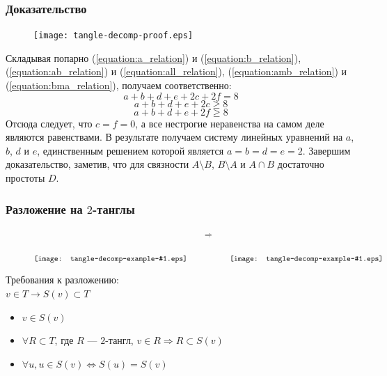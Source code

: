 \documentclass[dvips, intlimits, 9pt, unicode, notheorems]{beamer}
\def\putDC#1{\raise-11mm\hbox{\texttt{[image: tangle-decomp-example-\#1.eps]}}}
\theoremstyle{plain}
\theoremstyle{definition}
\begin{document}
	\begin{frame}
		\frametitle{Доказательство}

		\begin{figure}[H]
			\centering
			\texttt{[image: tangle-decomp-proof.eps]}
		\end{figure}

		Складывая попарно (\ref{equation:a_relation}) и (\ref{equation:b_relation}),
		(\ref{equation:ab_relation}) и (\ref{equation:all_relation}),
		(\ref{equation:amb_relation}) и (\ref{equation:bma_relation}), получаем соответственно:
		\[a + b + d + e + 2c + 2f = 8\]
		\[a + b + d + e + 2c \ge 8\]
		\[a + b + d + e + 2f \ge 8\]
		Отсюда следует, что $c = f = 0$, а все нестрогие неравенства на самом деле являются равенствами. В результате
		получаем систему линейных уравнений на $a$, $b$, $d$ и $e$, единственным решением которой является
		$a = b = d = e = 2$. Завершим доказательство, заметив, что для связности $A\setminus B$, $B\setminus A$ и
		$A\cap B$ достаточно простоты $D$.
	\end{frame}

	\begin{frame}
		\frametitle{Разложение на $2$-танглы}

		\begin{figure}[ht]
			\centering
			$$\putDC{1} \qquad \Rightarrow \qquad \putDC{2}$$
		\end{figure}

		Требования к разложению: \\
		$v \in T \rightarrow S(v) \subset T$
		\begin{itemize}
			\item $v \in S(v)$
			\item $\forall R \subset T$, где $R$ --- $2$-тангл, $v \in R \Rightarrow R \subset S(v)$
			\item $\forall u, u \in S(v) \Leftrightarrow S(u) = S(v)$
		\end{itemize}
	\end{frame}
\end{document}
